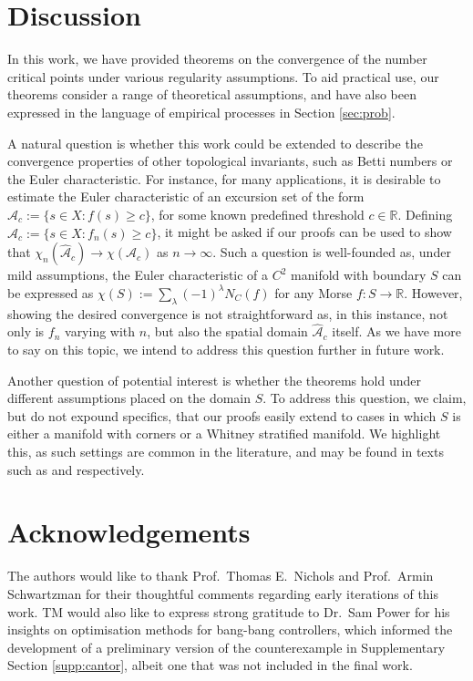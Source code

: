 \documentclass[11pt]{article}
\newcommand{\1}{\mathbf{1}}
\theoremstyle{definition}
\theoremstyle{remark}
\begin{document}
\section{Discussion}\label{sec:discussion}

In this work, we have provided theorems on the convergence of the number critical points under various regularity assumptions. To aid practical use, our theorems consider a range of theoretical assumptions, and have also been expressed in the language of empirical processes in Section \ref{sec:prob}.

A natural question is whether this work could be extended to describe the convergence properties of other topological invariants, such as Betti numbers or the Euler characteristic. For instance, for many applications, it is desirable to estimate the Euler characteristic of an excursion set of the form $\mathcal{A}_c:=\{s\in X: f(s)\geq c\}$, for some known predefined threshold $c\in\mathbb{R}$. Defining $\hat{\mathcal{A}}_c:=\{s\in X: f_n(s)\geq c\}$, it might be asked if our proofs can be used to show that $\chi_n(\hat{\mathcal{A}}_c)\rightarrow\chi(\mathcal{A}_c)$ as $n\rightarrow \infty$. Such a question is well-founded as, under mild assumptions, the Euler characteristic of a $C^2$ manifold with boundary $S$ can be expressed as $\chi(S):=\sum_\lambda (-1)^\lambda N_C(f)$ for any Morse $f:S\rightarrow \mathbb{R}$. However, showing the desired convergence is not straightforward as, in this instance, not only is $f_n$ varying with $n$, but also the spatial domain $\hat{\mathcal{A}}_c$ itself. As we have more to say on this topic, we intend to address this question further in future work.

Another question of potential interest is whether the theorems hold under different assumptions placed on the domain $S$. To address this question, we claim, but do not expound specifics, that our proofs easily extend to cases in which $S$ is either a manifold with corners or a Whitney stratified manifold. We highlight this, as such settings are common in the literature, and may be found in texts such as \cite{nicolaescu2007invitation} and \cite{Adler2009} respectively.

\section*{Acknowledgements}

The authors would like to thank Prof.~Thomas E.~Nichols and Prof.~Armin Schwartzman for their thoughtful comments regarding early iterations of this work. TM would also like to express strong gratitude to Dr.~Sam Power for his insights on optimisation methods for bang-bang controllers, which informed the development of a preliminary version of the counterexample in Supplementary Section \ref{supp:cantor}, albeit one that was not included in the final work.
 
\end{document}
